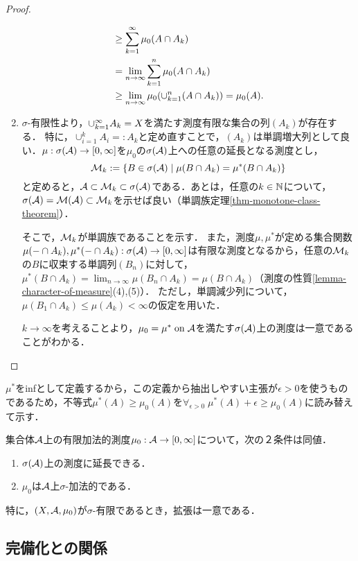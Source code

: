\documentclass[uplatex, dvipdfmx]{jsreport}
\begin{document}
\begin{proof}
\begin{enumerate}
\begin{align*}
            &\ge\sum_{k=1}^\infty\mu_0(A\cap A_k)\\
            &=\lim_{n\to\infty}\sum_{k=1}^n\mu_0(A\cap A_k)\\
            &\ge\lim_{n\to\infty}\mu_0(\cup_{k=1}^n(A\cap A_k))=\mu_0(A).
        \end{align*}
        \item 
        $\sigma$-有限性より，$\cup_{k=1}^\infty A_k=X$を満たす測度有限な集合の列$(A_k)$が存在する．
        特に，$\cup_{i=1}^kA_i=:A_k$と定め直すことで，$(A_k)$は単調増大列として良い．$\mu:\sigma(\mathcal{A})\to[0,\infty]$を$\mu_0$の$\sigma(\mathcal{A})$上への任意の延長となる測度とし，\[\mathcal{M}_k:=\left\{B\in\sigma(\mathcal{A})\mid\mu(B\cap A_k)=\mu^*(B\cap A_k)\right\}\]と定めると，$\mathcal{A}\subset\mathcal{M}_k\subset\sigma(\mathcal{A})$である．あとは，任意の$k\in\mathbb{N}$について，$\sigma(\mathcal{A})=\mathcal{M}(\mathcal{A})\subset\mathcal{M}_k$を示せば良い（単調族定理\ref{thm-monotone-class-theorem}）．

        そこで，$\mathcal{M}_k$が単調族であることを示す．
        また，測度$\mu,\mu^*$が定める集合関数$\mu(-\cap A_k),\mu^*(-\cap A_k):\sigma(\mathcal{A})\to[0,\infty]$は有限な測度となるから，任意の$\mathcal{M}_k$の$B$に収束する単調列$(B_n)$に対して，$\mu^*(B\cap A_k)=\lim_{n\to\infty}\mu(B_n\cap A_k)=\mu(B\cap A_k)$（測度の性質\ref{lemma-character-of-measure}(4),(5)）．
        ただし，単調減少列について，$\mu(B_1\cap A_k)\le\mu(A_k)<\infty$の仮定を用いた．

        $k\to\infty$を考えることより，$\mu_0=\mu^*\;\mathrm{on}\;\mathcal{A}$を満たす$\sigma(\mathcal{A})$上の測度は一意であることがわかる．
    \end{enumerate}
\end{proof}
\begin{remarks}
    $\mu^*$をinfとして定義するから，この定義から抽出しやすい主張が$\epsilon>0$を使うものであるため，不等式$\mu^*(A)\ge\mu_0(A)$を$\forall_{\epsilon>0}\;\mu^*(A)+\epsilon\ge\mu_0(A)$に読み替えて示す．
\end{remarks}

\begin{theorem}
    集合体$\mathcal{A}$上の有限加法的測度$\mu_0:\mathcal{A}\to[0,\infty]$について，次の２条件は同値．
    \begin{enumerate}
        \item $\sigma(\mathcal{A})$上の測度に延長できる．
        \item $\mu_0$は$\mathcal{A}$上$\sigma$-加法的である．
    \end{enumerate}
    特に，$(X,\mathcal{A},\mu_0)$が$\sigma$-有限であるとき，拡張は一意である．
\end{theorem}

\subsection{完備化との関係}
\end{document}
